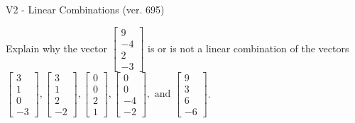 \begin{exercise}
  \begin{exerciseTitle}V2 - Linear Combinations (ver. 695)\end{exerciseTitle}
  \begin{exerciseStatement}
    Explain why the vector \(\left[\begin{array}{c}
9 \\
-4 \\
2 \\
-3
\end{array}\right]\)  is or is not a linear 
	combination of the vectors \(\left[\begin{array}{c}
3 \\
1 \\
0 \\
-3
\end{array}\right] , \left[\begin{array}{c}
3 \\
1 \\
2 \\
-2
\end{array}\right] , \left[\begin{array}{c}
0 \\
0 \\
2 \\
1
\end{array}\right] , \left[\begin{array}{c}
0 \\
0 \\
-4 \\
-2
\end{array}\right] , \text{ and } \left[\begin{array}{c}
9 \\
3 \\
6 \\
-6
\end{array}\right]\).
	



\end{exerciseStatement}
\end{exercise}
